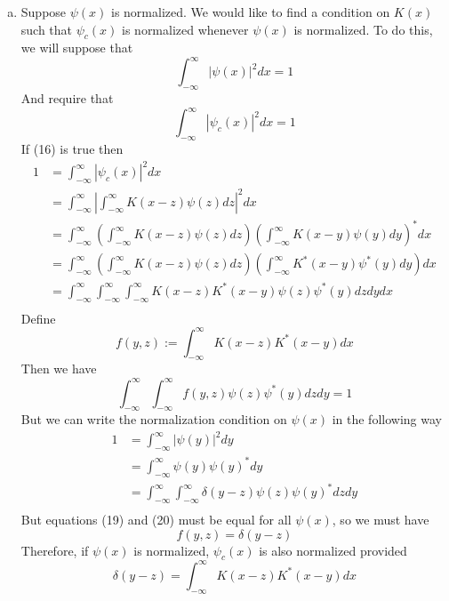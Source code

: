 \documentclass[]{book}
\begin{document}
\begin{enumerate}[(a)]
\item Suppose $\psi(x)$ is normalized. We would like to find a condition on $K(x)$ such that $\psi_c(x)$ is normalized whenever $\psi(x)$ is normalized. To do this, we will suppose that
\begin{equation}
\int_{-\infty}^{\infty}|\psi(x)|^2dx=1
\end{equation}
And require that
\begin{equation}
\int_{-\infty}^{\infty}|\psi_c(x)|^2dx=1
\end{equation}
If (16) is true then
\begin{equation}
\begin{split}
1 &= \int_{-\infty}^{\infty}|\psi_c(x)|^2dx \\
&= \int_{-\infty}^{\infty}|\int_{-\infty}^{\infty}K(x-z)\psi(z)dz|^2dx \\
&= \int_{-\infty}^{\infty}(\int_{-\infty}^{\infty}K(x-z)\psi(z)dz)(\int_{-\infty}^{\infty}K(x-y)\psi(y)dy)^*dx \\
&= \int_{-\infty}^{\infty}(\int_{-\infty}^{\infty}K(x-z)\psi(z)dz)(\int_{-\infty}^{\infty}K^*(x-y)\psi^*(y)dy)dx \\
&= \int_{-\infty}^{\infty}\int_{-\infty}^{\infty}\int_{-\infty}^{\infty}K(x-z)K^*(x-y)\psi(z)\psi^*(y)dzdydx \\
\end{split}
\end{equation}
Define
\begin{equation}
f(y,z):=\int_{-\infty}^{\infty}K(x-z)K^*(x-y)dx
\end{equation}
Then we have
\begin{equation}
\int_{-\infty}^{\infty}\int_{-\infty}^{\infty}f(y,z)\psi(z)\psi^*(y)dzdy =1
\end{equation}
But we can write the normalization condition on $\psi(x)$ in the following way
\begin{equation}
\begin{split}
1 &= \int_{-\infty}^{\infty}|\psi(y)|^2dy \\
&= \int_{-\infty}^{\infty}\psi(y)\psi(y)^*dy \\
&= \int_{-\infty}^{\infty}\int_{-\infty}^{\infty}\delta(y-z)\psi(z)\psi(y)^*dzdy \\
\end{split}
\end{equation}
But equations (19) and (20) must be equal for all $\psi(x)$, so we must have
\begin{equation}
f(y,z)=\delta(y-z)
\end{equation}
Therefore, if $\psi(x)$ is normalized, $\psi_c(x)$ is also normalized provided
\begin{equation}
\delta(y-z)=\int_{-\infty}^{\infty}K(x-z)K^*(x-y)dx
\end{equation}
\end{enumerate}
\end{document}
